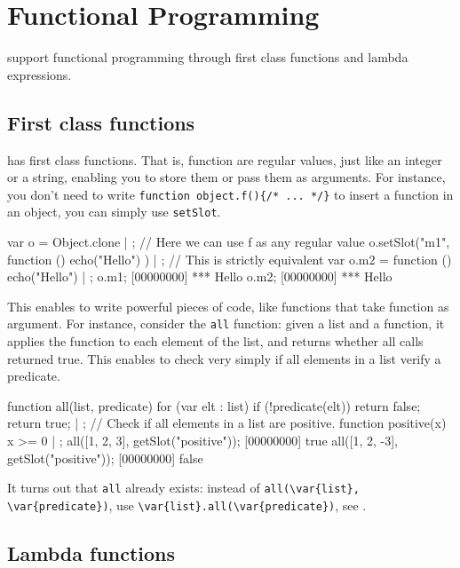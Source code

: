 \chapter{Functional Programming}
\label{sec:tut:functional}

\us support functional programming through first class functions and
lambda expressions.

\section{First class functions}

\us has first class functions. That is, function are regular values,
just like an integer or a string, enabling you to store them or pass
them as arguments. For instance, you don't need to write
\lstinline|function object.f(){/* ... */}| to insert a function in an
object, you can simply use \lstinline{setSlot}.

\begin{urbiscript}[firstnumber=1]
var o = Object.clone | {};
// Here we can use f as any regular value
o.setSlot("m1", function () { echo("Hello") }) | {};
// This is strictly equivalent
var o.m2 = function () { echo("Hello") } | {};
o.m1;
[00000000] *** Hello
o.m2;
[00000000] *** Hello
\end{urbiscript}

This enables to write powerful pieces of code, like functions that
take function as argument. For instance, consider the \lstinline{all}
function: given a list and a function, it applies the function to each
element of the list, and returns whether all calls returned true. This
enables to check very simply if all elements in a list verify a
predicate.

\begin{urbiscript}
function all(list, predicate)
{
  for (var elt : list)
    if (!predicate(elt))
      return false;
  return true;
} | {};
// Check if all elements in a list are positive.
function positive(x) { x >= 0 } | {};
all([1, 2, 3], getSlot("positive"));
[00000000] true
all([1, 2, -3], getSlot("positive"));
[00000000] false
\end{urbiscript}

It turns out that \lstinline|all| already exists: instead of
\lstinline|all(\var{list}, \var{predicate})|, use
\lstinline|\var{list}.all(\var{predicate})|, see .

\section{Lambda functions}

